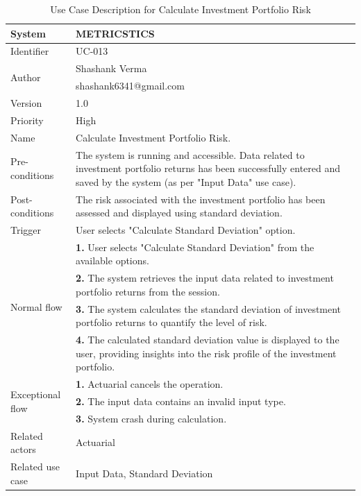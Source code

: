 \begin{table}[htb]
    \centering
     \begin{tabular}{|p{4cm}|p{12cm}|} \hline 
         System &  METRICSTICS\\ \hline 
         
         Identifier & UC-013 \\ \hline 
         
         \multirow{2}{*}{Author} & Shashank Verma   \\
         &shashank6341@gmail.com \\
           \hline 
           Version & 1.0\\ \hline
         
         Priority &  High\\ \hline 
         
         Name &  Calculate Investment Portfolio Risk. \\ \hline 
         Pre-conditions & The system is running and accessible.
Data related to investment portfolio returns has been successfully entered and saved by the system (as per "Input Data" use case).
 \\ \hline 
         Post-conditions & The risk associated with the investment portfolio has been assessed and displayed using standard deviation.  \\ \hline
         Trigger & User selects "Calculate Standard Deviation" option. \\ \hline
        \multirow{4}{*}{Normal flow} 
        & \textbf{1.} User selects "Calculate Standard Deviation" from the available options. \\ 
        & \textbf{2.} The system retrieves the input data related to investment portfolio returns from the session.   \\ 
 & \textbf{3.} The system calculates the standard deviation of investment portfolio returns to quantify the level of risk.\\ 
  & \textbf{4.} The calculated standard deviation value is displayed to the user, providing insights into the risk profile of the investment portfolio.\\ 
        

         
        
        \hline
        \multirow{3}{*}{Exceptional flow} 
        & \textbf{1.} Actuarial cancels the operation. \\ 
        & \textbf{2.} The input data contains an invalid input type. \\
         & \textbf{3.} System crash during calculation. \\  \hline 
        Related actors & Actuarial \\ \hline
        Related use case & Input Data, Standard Deviation  \\ \hline
    \end{tabular}
    \caption{Use Case Description for Calculate Investment Portfolio Risk}
    \label{tab:my_label}
\end{table}

